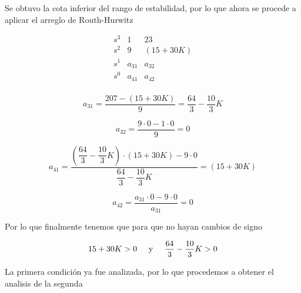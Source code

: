 Se obtuvo la cota inferior del rango de estabilidad, por lo que ahora se 
procede a aplicar el arreglo de Routh-Hurwitz



\[
    \begin{array}
    {c|cc}
    s^3 & 1 & 23 \\
    s^2 & 9 & (15 + 30K) \\
    s^1 & a_{31} & a_{32} \\
    s^0 & a_{41} & a_{42} \\
    \end{array}
\]

\vspace{1cm}

\begin{equation*}
    a_{31} = \dfrac{207 - (15 + 30K) }{9} = \dfrac{64}{3} - \dfrac{10}{3} K
\end{equation*}

\vspace{0.1cm}

\begin{equation*}
    a_{32} = \dfrac{9 \cdot 0 - 1 \cdot 0}{9} = 0
\end{equation*}

\vspace{0.1cm}

\begin{equation*}
    a_{41} = \dfrac{(\dfrac{64}{3} - \dfrac{10}{3} K) \cdot (15 + 30K) - 9 
    \cdot 0}{\dfrac{64}{3} - \dfrac{10}{3} K} = (15 + 30K)
\end{equation*}

\vspace{0.3cm}

\begin{equation*}
    a_{42} = \dfrac{a_{31} \cdot 0 - 9 \cdot 0 }{a_{31}} = 0
\end{equation*}
    
\vspace{0.3cm}


Por lo que finalmente tenemos que para que no hayan cambios de signo

\begin{equation*}
    15 + 30K > 0 \hspace{0.5cm} \text{y}
    \hspace{0.5cm} \dfrac{64}{3} - \dfrac{10}{3} K > 0
\end{equation*}

La primera condición ya fue analizada, por lo que procedemos a obtener
el analisis de la segunda


